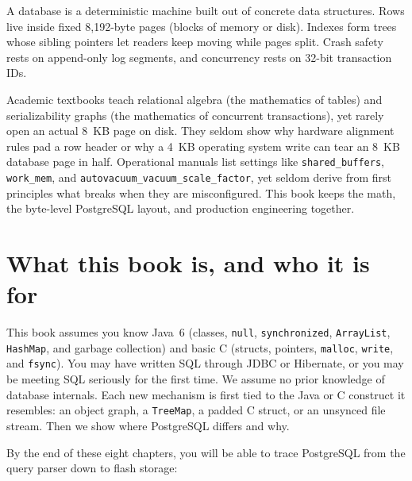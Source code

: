 A database is a deterministic machine built out of concrete data structures. Rows live inside fixed 8,192-byte pages (blocks of memory or disk). Indexes form trees whose sibling pointers let readers keep moving while pages split. Crash safety rests on append-only log segments, and concurrency rests on 32-bit transaction IDs.

Academic textbooks teach relational algebra (the mathematics of tables) and serializability graphs (the mathematics of concurrent transactions), yet rarely open an actual 8~KB page on disk. They seldom show why hardware alignment rules pad a row header or why a 4~KB operating system write can tear an 8~KB database page in half. Operational manuals list settings like \texttt{shared\_buffers}, \texttt{work\_mem}, and \texttt{autovacuum\_vacuum\_scale\_factor}, yet seldom derive from first principles what breaks when they are misconfigured. This book keeps the math, the byte-level PostgreSQL layout, and production engineering together.

\section*{What this book is, and who it is for}

This book assumes you know Java~6 (classes, \texttt{null}, \texttt{synchronized}, \texttt{ArrayList}, \texttt{HashMap}, and garbage collection) and basic C (structs, pointers, \texttt{malloc}, \texttt{write}, and \texttt{fsync}). You may have written SQL through JDBC or Hibernate, or you may be meeting SQL seriously for the first time. We assume no prior knowledge of database internals. Each new mechanism is first tied to the Java or C construct it resembles: an object graph, a \texttt{TreeMap}, a padded C struct, or an unsynced file stream. Then we show where PostgreSQL differs and why.

By the end of these eight chapters, you will be able to trace PostgreSQL from the query parser down to flash storage:

